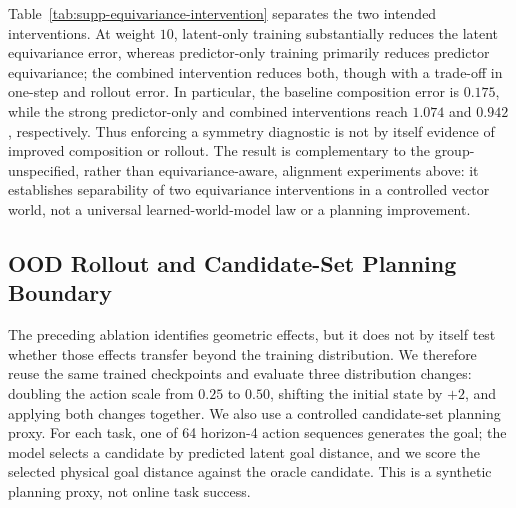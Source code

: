 \documentclass{article}
\begin{document}
Table~\ref{tab:supp-equivariance-intervention} separates the two intended
interventions. At weight $10$,
latent-only training substantially reduces the latent equivariance error,
whereas predictor-only training primarily reduces predictor equivariance; the
combined intervention reduces both, though with a trade-off in one-step and
rollout error. In particular, the baseline composition error is $0.175$,
while the strong predictor-only and combined interventions reach $1.074$ and
$0.942$, respectively. Thus enforcing a symmetry diagnostic is not by itself
evidence of improved composition or rollout. The result is complementary to
the group-unspecified, rather than equivariance-aware, alignment experiments
above: it establishes
separability of two equivariance interventions in a controlled vector world,
not a universal learned-world-model law or a planning improvement.

\subsection{OOD Rollout and Candidate-Set Planning Boundary}
\label{sec:supp-equivariance-functional}

The preceding ablation identifies geometric effects, but it does not by itself
test whether those effects transfer beyond the training distribution. We
therefore reuse the same trained checkpoints and evaluate three distribution
changes: doubling the action scale from $0.25$ to $0.50$, shifting the initial
state by $+2$, and applying both changes together. We also use a controlled
candidate-set planning proxy. For each task, one of 64 horizon-4 action
sequences generates the goal; the model selects a candidate by predicted
latent goal distance, and we score the selected physical goal distance against
the oracle candidate. This is a synthetic planning proxy, not online task
success.
\end{document}
